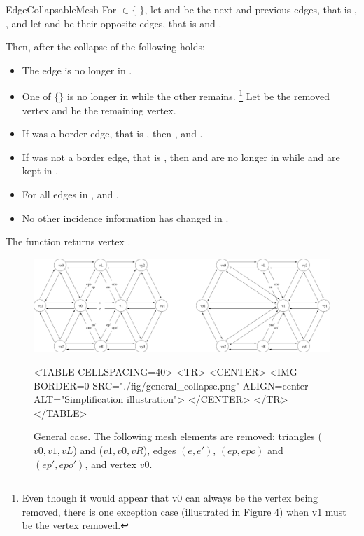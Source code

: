 \begin{ccRefConcept}{EdgeCollapsableMesh}
For  $\in \{$  $\}$, let  and  be the next and previous 
edges, that is , , and let 
 and  be their opposite edges, that is 
 and .

Then, after the collapse of  the following holds:

\begin{itemize}
\item The edge  is no longer in .
\item One of $\{$$\}$ is no longer in  while the other remains.
\footnote{Even though it would appear that v0 can always be the vertex being removed, there is one exception case (illustrated in Figure 4) when v1 must be the vertex removed.}
Let  be the removed vertex and  be the remaining vertex.
\item If  was a border edge, that is , then , and .
\item If  was not a border edge, that is , then  and  are no longer in  while  and  are kept in .
\item For all edges  in ,  and .
\item No other incidence information has changed in .
\end{itemize}

The function returns vertex . 

\begin{figure}[htpb]
\begin{ccTexOnly}
\begin{center}
\includegraphics[width=17cm]{Surface_mesh_simplification_ref/fig/general_collapse} %
\end{center}
\end{ccTexOnly}
\begin{ccHtmlOnly}
<TABLE CELLSPACING=40>
<TR>
<CENTER>
<IMG BORDER=0 SRC="./fig/general_collapse.png" ALIGN=center ALT="Simplification illustration">
</CENTER>
</TR>
</TABLE>
\end{ccHtmlOnly}
\caption{General case. The following mesh elements are removed: triangles ($v0,v1,vL$) and ($v1,v0,vR$), edges $(e,e')$, $(ep,epo)$ and $(ep',epo')$, and vertex $v0$.}
\end{figure}




\end{ccRefConcept}
